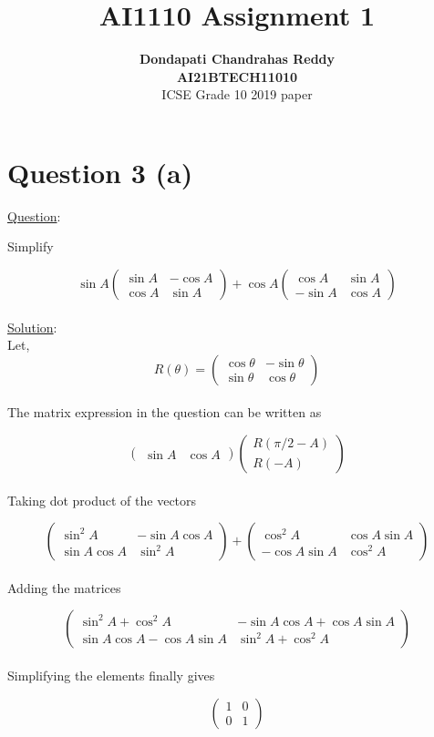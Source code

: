 \documentclass[journal,12pt,twocolumn]{IEEEtran}
\newcommand{\myvec}[1]{\ensuremath{\begin{pmatrix}#1\end{pmatrix}}}
\begin{document}
\title{\textbf{AI1110 Assignment 1} }
\author{\textbf{Dondapati Chandrahas Reddy}\\ \textbf{AI21BTECH11010}\\ ICSE Grade 10 2019 paper}

\maketitle

{\section {Question 3 (a) \newline}}
{\large \underline{Question}:\newline}

Simplify

\begin{equation*}
\sin A\myvec{\sin A &  -\cos A \\ \cos A & \sin A} + \cos A \myvec{\cos A &  \sin A \\ -\sin A & \cos A}
\end{equation*}\\

{\large \underline{Solution}:}\\

Let,
\begin{equation*}
R(\theta) = \myvec{\cos \theta &  -\sin \theta \\ \sin \theta & \cos \theta}
\end{equation*}\\

The matrix expression in the question can be written as

\begin{equation*}
\myvec{\sin A & \cos A} \myvec{R(\pi/2 - A) \\ R( -A)}
\end{equation*}\\

Taking dot product of the vectors

\begin{equation*}
\myvec{\sin^2 A &  -\sin A\cos A \\ \sin A\cos A & \sin^2 A} +\myvec{\cos^2 A & \cos A\sin A \\ -\cos A\sin A & \cos^2 A}
\end{equation*}\\

Adding the matrices

\begin{equation*}
\myvec{\sin^2 A + \cos^2 A &  -\sin A \cos A +\cos A \sin A \\ \sin A \cos A -\cos A \sin A & \sin^2 A + \cos^2 A}
\end{equation*}\\

Simplifying the elements finally gives

\begin{equation*}
\myvec{1 & 0 \\ 0 & 1}
\end{equation*}\\
\end{document}
